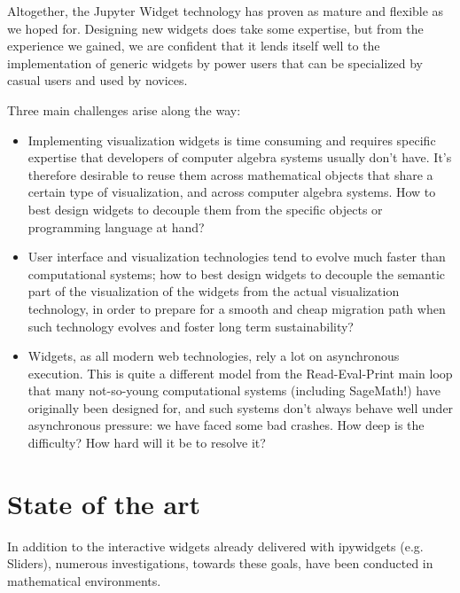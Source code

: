 \documentclass{deliverablereport}
\begin{document}

Altogether, the Jupyter Widget technology has proven as mature and
flexible as we hoped for. Designing new widgets does take some
expertise, but from the experience we gained, we are confident that it
lends itself well to the implementation of generic widgets by power
users that can be specialized by casual users and used by novices.

Three main challenges arise along the way:
\begin{itemize}
\item Implementing visualization widgets is time consuming and
  requires specific expertise that developers of computer algebra
  systems usually don't have. It's therefore desirable to reuse them
  across mathematical objects that share a certain type of
  visualization, and across computer algebra systems. How to best
  design widgets to decouple them from the specific objects or
  programming language at hand?
\item User interface and visualization technologies tend to evolve
  much faster than computational systems; how to best design widgets
  to decouple the semantic part of the visualization of the widgets
  from the actual visualization technology, in order to prepare for a
  smooth and cheap migration path when such technology evolves and
  foster long term sustainability?
\item Widgets, as all modern web technologies, rely a lot on
  asynchronous execution. This is quite a different model from the
  Read-Eval-Print main loop that many not-so-young computational
  systems (including SageMath!) have originally been designed for, and
  such systems don't always behave well under asynchronous pressure:
  we have faced some bad crashes. How deep is the difficulty? How hard
  will it be to resolve it?
\end{itemize}

\section{State of the art}


In addition to the interactive widgets already delivered with ipywidgets (e.g. Sliders), numerous investigations, towards these goals, have been conducted in mathematical environments.
\end{document}
